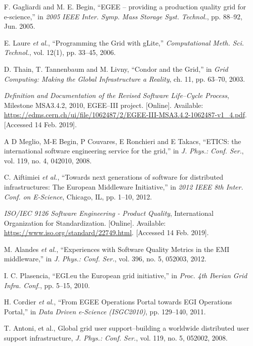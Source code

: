 \begin{thebibliography}{1}
F. Gagliardi and M. E. Begin,
``EGEE -- providing a production quality grid for e-science,''
in \emph{2005 IEEE Inter. Symp. Mass Storage Syst. Technol.},
pp. 88--92, Jun. 2005.


E. Laure \emph{et al.},
``Programming the Grid with gLite,''
\emph{Computational Meth. Sci. Technol.},
vol. 12(1), pp. 33--45, 2006.

D. Thain, T. Tannenbaum and M. Livny,
``Condor and the Grid,''
in \emph{Grid Computing: Making the Global Infrastructure a Reality},
ch. 11, pp. 63--70, 2003.


\emph{Definition and Documentation of the Revised Software Life--Cycle Process},
Milestone MSA3.4.2, 2010, EGEE--III project.
[Online]. Available: \url{https://edms.cern.ch/ui/file/1062487/2/EGEE-III-MSA3.4.2-1062487-v1_4.pdf}.
[Accessed 14 Feb. 2019].

A D Meglio, M-E Begin, P Couvares, E Ronchieri and E Takacs,
``ETICS: the international software engineering service for the grid,''
in \emph{J. Phys.: Conf. Ser.},
vol. 119, no. 4, 042010, 2008.



C. Aiftimiei \emph{et al.},
``Towards next generations of software for distributed infrastructures: The European Middleware Initiative,''
in \emph{2012 IEEE 8th Inter. Conf. on E-Science},
Chicago, IL, pp. 1--10, 2012.

\emph{ISO/IEC 9126 Software Engineering - Product Quality},
International Organization for Standardization.
[Online]. Available: \url{https://www.iso.org/standard/22749.html}.
[Accessed 14 Feb. 2019].

M. Alandes \emph{et al.},
``Experiences with Software Quality Metrics in the EMI middleware,''
in \emph{J. Phys.: Conf. Ser.},
vol. 396, no. 5, 052003, 2012.

I. C. Plasencia,
``EGI.eu the European grid initiative,''
in \emph{Proc. 4th Iberian Grid Infra. Conf.},
pp. 5--15, 2010.

H. Cordier \emph{et al.},
``From EGEE Operations Portal towards EGI Operations Portal,''
in \emph{Data Driven e-Science (ISGC2010)},
pp. 129--140, 2011.

T. Antoni, et al.,
Global grid user support--building a worldwide distributed user support infrastructure,
\emph{J. Phys.: Conf. Ser.},
vol. 119, no. 5, 052002, 2008.


\end{thebibliography}
